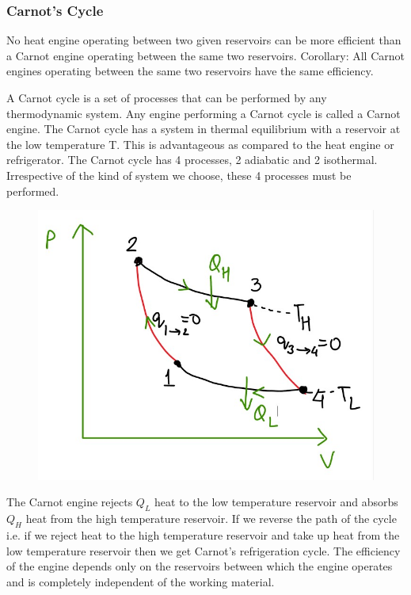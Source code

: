 \documentclass[12pt]{article}
\begin{document}
\subsubsection{Carnot's Cycle}
\begin{tcolorbox}[title=Carnot's Theorem]
	No heat engine operating between two given reservoirs can be more efficient than a Carnot engine operating between the same two reservoirs.
    \tcblower
    Corollary: All Carnot engines operating between the same two reservoirs have the same efficiency.
\end{tcolorbox}
A Carnot cycle is a set of processes that can be performed by any thermodynamic system. Any engine performing a Carnot cycle is called a Carnot engine. The Carnot cycle has a system in thermal equilibrium with a reservoir at the low temperature T. This is advantageous as compared to the heat engine or refrigerator. The Carnot cycle has 4 processes, 2 adiabatic and 2 isothermal. Irrespective of the kind of system we choose, these 4 processes must be performed. 

\begin{figure}[h]
\includegraphics[scale=0.6]{carnot.jpg}
\centering
\end{figure}
The Carnot engine rejects $Q_L$ heat to the low temperature reservoir and absorbs $Q_H$ heat from the high temperature reservoir. If we reverse the path of the cycle i.e. if we reject heat to the high temperature reservoir and take up heat from the low temperature reservoir then we get Carnot's refrigeration cycle. The efficiency of the engine depends only on the reservoirs between which the engine operates and is completely independent of the working material. \\
\end{document}
